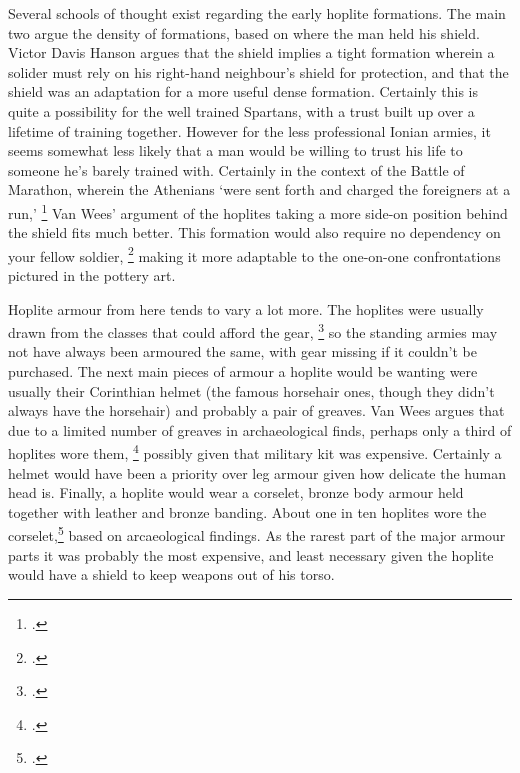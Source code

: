 \documentclass[twoside, a4paper, 12pt]{article}
\begin{document}
\par\vspace{1em}

Several schools of thought exist regarding the early hoplite formations. The
main two argue the density of formations, based on where the man held his shield.
Victor Davis Hanson argues that the shield implies a tight formation wherein
a solider must rely on his right-hand neighbour's shield for protection, and
that the shield was an adaptation for a more useful dense formation.\footnotemark
{}
Certainly this is quite a possibility for the well trained Spartans, with a
trust built up over a lifetime of training together. However for the less
professional Ionian armies, it seems somewhat less likely that a man would be
willing to trust his life to someone he's barely trained with. Certainly
in the context of the Battle of Marathon, wherein the Athenians
`were sent forth and charged the foreigners at a run,'
\footcite[Book 6.112]{herodotus_1920} Van Wees' argument of the hoplites taking
a more side-on position behind the shield fits much better.
This formation would also require no dependency on your
fellow soldier, \footcite[58]{wees_hoplite_bronze} making it more adaptable to
the one-on-one confrontations pictured in the pottery art.

\par\vspace{1em}

Hoplite armour from here tends to vary a lot more. The hoplites
were usually drawn from the classes that could afford the gear, \footcite[38]{wietzel_wheeler_1970}
so the standing armies may not have always been armoured the same, with gear
missing if it couldn't be purchased. The next main pieces of armour a hoplite
would be wanting were usually their Corinthian helmet (the famous horsehair
ones, though they didn't always have the horsehair) and probably a pair of greaves.
Van Wees argues that due to a limited number of greaves in archaeological finds,
perhaps only a third of hoplites wore them, \footcite[50]{wees_2004} possibly given
that military kit was expensive. Certainly a helmet would have been a priority
over leg armour given how delicate the human head is. Finally, a hoplite would
wear a corselet, bronze body armour held together with leather and bronze banding.
About one in ten hoplites wore the corselet,\footcite{wees_1997} based on
arcaeological findings. As the rarest part of the major
armour parts it was probably the most expensive, and least necessary given the
hoplite would have a shield to keep weapons out of his torso.
\end{document}
